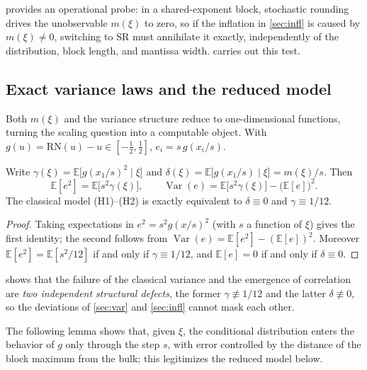 \documentclass[review,hidelinks,oneeqnum,onetabnum,onefignum,onethmnum]{siamart251216}
\begin{document}
 provides an operational probe: in a shared-exponent block,
stochastic rounding drives the unobservable $m(\xi)$ to zero, so if the
inflation in \cref{sec:infl} is caused by $m(\xi)\ne0$, switching to SR must
annihilate it exactly, independently of the distribution, block length, and
mantissa width.  carries out this test.

\subsection{Exact variance laws and the reduced model}
\label{sec:modeltheory}

Both $m(\xi)$ and the variance structure reduce to one-dimensional functions,
turning the scaling question into a computable object. With
$g(u)=\mathrm{RN}(u)-u\in[-\tfrac12,\tfrac12]$, $e_i=s\,g(x_i/s)$.

\begin{proposition}
\label{prop:var}
Write $\gamma(\xi)=\mathbb{E}\bigl[g(x_1/s)^2\mid\xi\bigr]$ and
$\delta(\xi)=\mathbb{E}\bigl[g(x_1/s)\mid\xi\bigr]=m(\xi)/s$. Then
\begin{equation}
\mathbb{E}[e^2]=\mathbb{E}\bigl[s^2\gamma(\xi)\bigr],
\qquad
\operatorname{Var}(e)=\mathbb{E}\bigl[s^2\gamma(\xi)\bigr]-\bigl(\mathbb{E}[e]\bigr)^2 .
\label{eq:vardecomp}
\end{equation}
The classical model (H1)--(H2) is exactly equivalent to $\delta\equiv0$ and
$\gamma\equiv1/12$.
\end{proposition}

\begin{proof}
Taking expectations in $e^2=s^2g(x/s)^2$ (with $s$ a function of $\xi$) gives
the first identity; the second follows from
$\operatorname{Var}(e)=\mathbb{E}[e^2]-(\mathbb{E}[e])^2$. Moreover
$\mathbb{E}[e^2]=\mathbb{E}[s^2/12]$ if and only if $\gamma\equiv1/12$, and
$\mathbb{E}[e]=0$ if and only if $\delta\equiv0$.
\end{proof}

 shows that the failure of the classical variance and the
emergence of correlation are \emph{two independent structural defects}, the
former $\gamma\not\equiv1/12$ and the latter $\delta\not\equiv0$, so the
deviations of \cref{sec:var} and \cref{sec:infl} cannot mask each other.

The following lemma shows that, given $\xi$, the conditional distribution enters
the behavior of $g$ only through the step $s$, with error controlled by the
distance of the block maximum from the bulk; this legitimizes the reduced model
below.
\end{document}
